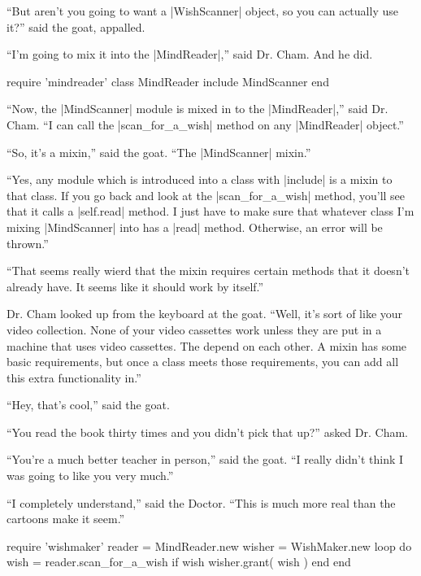 \documentclass[12pt,twoside]{report}
\begin{document}
``But aren't you going to want a
\rubyinline|WishScanner| object, so you can actually
use it?'' said the goat, appalled.

``I'm going to mix it into the
\rubyinline|MindReader|,'' said Dr. Cham.  And he did.


\begin{rubycode}

 require 'mindreader'
 class MindReader
   include MindScanner
 end

\end{rubycode}


``Now, the \rubyinline|MindScanner| module is mixed in
to the \rubyinline|MindReader|,'' said Dr. Cham. ``I
can call the \rubyinline|scan_for_a_wish| method on
any \rubyinline|MindReader| object.''

``So, it's a mixin,'' said the goat.  ``The
\rubyinline|MindScanner| mixin.''

``Yes, any module which is introduced into a class with
\rubyinline|include| is a mixin to that class.  If you
go back and look at the \rubyinline|scan_for_a_wish|
method, you'll see that it calls a
\rubyinline|self.read| method.  I just have to make
sure that whatever class I'm mixing
\rubyinline|MindScanner| into has a
\rubyinline|read| method.  Otherwise, an error will be
thrown.''

``That seems really wierd that the mixin requires certain methods that
it doesn't already have. It seems like it should work by itself.''

Dr. Cham looked up from the keyboard at the goat.  ``Well, it's sort
of like your video collection. None of your video cassettes work
unless they are put in a machine that uses video cassettes. The depend
on each other.  A mixin has some basic requirements, but once a class
meets those requirements, you can add all this extra functionality
in.''

``Hey, that's cool,'' said the goat.

``You read the book thirty times and you didn't pick that up?'' asked
Dr. Cham.

``You're a much better teacher in person,'' said the goat.  ``I really
didn't think I was going to like you very much.''

``I completely understand,'' said the Doctor.  ``This is much more
real than the cartoons make it seem.''


\begin{rubycode}

 require 'wishmaker'
 reader = MindReader.new
 wisher = WishMaker.new
 loop do
   wish = reader.scan_for_a_wish
   if wish
     wisher.grant( wish )
   end
 end

\end{rubycode}
\end{document}
